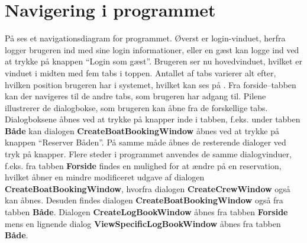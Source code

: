 \section{Navigering i programmet}
På  ses et navigationsdiagram for programmet.
Øverst er login-vinduet, herfra logger brugeren ind med sine login informationer, eller en gæst kan logge ind ved at trykke på knappen ``Login som gæst''. 
Brugeren ser nu hovedvinduet, hvilket er vinduet i midten med fem tabs i toppen.
Antallet af tabs varierer alt efter, hvilken position brugeren har i systemet, hvilket kan ses på . 
Fra forside--tabben kan der navigeres til de andre tabs, som brugeren har adgang til.
Pilene illustrerer de dialogbokse, som brugeren kan åbne fra de forskellige tabs.
Dialogboksene åbnes ved at trykke på knapper inde i tabben, f.eks. under tabben \textbf{Både} kan dialogen \textbf{CreateBoatBookingWindow} åbnes ved at trykke på knappen ``Reserver Båden''. 
På samme måde åbnes de resterende dialoger ved tryk på knapper.
Flere steder i programmet anvendes de samme dialogvinduer, f.eks. fra tabben \textbf{Forside} findes en mulighed for at ændre på en reservation, hvilket åbner en mindre modificeret udgave af dialogen \textbf{CreateBoatBookingWindow}, hvorfra dialogen \textbf{CreateCrewWindow} også kan åbnes.
Desuden findes dialogen \textbf{CreateBoatBookingWindow} også fra tabben \textbf{Både}.
Dialogen \textbf{CreateLogBookWindow} åbnes fra tabben \textbf{Forside} mens en lignende dialog \textbf{ViewSpecificLogBookWindow} åbnes fra tabben \textbf{Både}.

